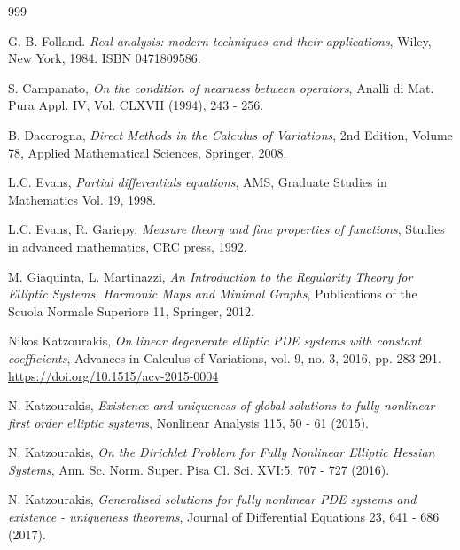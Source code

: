 \documentclass{amsart}
\numberwithin{equation}{section}
\numberwithin{thm}{section}
\theoremstyle{definition}
\renewcommand{\:}{\!:\!} %
\renewcommand{\^}[1]{^{#1}_{\phantom{l}}}
\begin{document}
\begin{thebibliography}{999}



G. B. Folland. \textit{Real analysis: modern techniques and their applications}, Wiley, New York, 1984. ISBN 0471809586.

 S. Campanato, \emph{On the condition of nearness between operators},
Analli di Mat. Pura Appl. IV, Vol. CLXVII (1994), 243 - 256.

 B. Dacorogna,  \emph{Direct Methods in the Calculus of Variations}, 2nd Edition, Volume 78, Applied Mathematical Sciences, Springer, 2008.

 L.C. Evans, \emph{Partial differentials equations}, AMS, Graduate Studies in Mathematics Vol. 19, 1998.

 L.C. Evans, R. Gariepy, \emph{Measure theory and fine properties of functions}, Studies in advanced mathematics, CRC press, 1992.

 M. Giaquinta, L. Martinazzi, \emph{An Introduction to the Regularity Theory for Elliptic Systems, Harmonic Maps and Minimal Graphs}, Publications of the Scuola Normale Superiore 11, Springer, 2012.

 Nikos Katzourakis, \textit{On linear degenerate elliptic PDE systems with constant coefficients}, Advances in Calculus of Variations, vol. 9, no. 3, 2016, pp. 283-291. \url{https://doi.org/10.1515/acv-2015-0004}

 N. Katzourakis, \emph{Existence and uniqueness of global solutions to fully nonlinear first order elliptic systems}, Nonlinear Analysis 115, 50 - 61 (2015). 

 N. Katzourakis,  \emph{On the Dirichlet Problem for Fully Nonlinear Elliptic Hessian Systems}, Ann. Sc. Norm. Super. Pisa Cl. Sci. XVI:5, 707 - 727 (2016).

 N. Katzourakis, \emph{Generalised solutions for fully nonlinear PDE systems and existence - uniqueness theorems}, Journal of Differential Equations 23, 641 - 686 (2017).
\end{thebibliography}

\medskip
\end{document}
